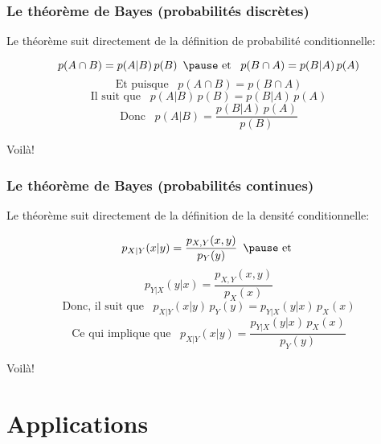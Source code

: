 \documentclass{beamer}
\begin{document}
\begin{frame}
    \frametitle{Le théorème de Bayes (probabilités discrètes)}
    Le théorème suit directement de la définition de probabilité conditionnelle:

    \pause

    \[p(A \cap B) =  p(A | B) \, p(B) \,\,\, \pause \textrm{ et } \,\,\, p(B \cap A) =  p(B | A) \, p(A)\]
    \pause
    \[\textrm{Et puisque } \,\,\, p(A \cap B) = p(B \cap A)\]
    \pause
    \[\textrm{Il suit que } \,\,\, p(A | B) \, p(B) = p(B | A) \, p(A)\]
    \pause
    \[\textrm{Donc } \,\,\, p(A | B) = \frac{p(B | A) \, p(A)}{p(B)}\]
    
    Voilà!
\end{frame}


\begin{frame}
    \frametitle{Le théorème de Bayes (probabilités continues)}
    Le théorème suit directement de la définition de la densité conditionnelle:

    \pause

    \[p_{X|Y}(x|y) = \frac{p_{X,Y}(x,y)}{p_Y(y)} \,\,\, \pause \textrm{ et }\]
    \[p_{Y|X}(y|x) = \frac{p_{X,Y}(x,y)}{p_X(x)}\]
    \pause
    \[\textrm{Donc, il suit que } \,\,\, p_{X|Y}(x|y) \, p_Y(y) = p_{Y|X}(y|x) \, p_X(x)\]
    \pause
    \[\textrm{Ce qui implique que } \,\,\, p_{X|Y}(x|y) = \frac{p_{Y|X}(y|x) \, p_X(x)}{p_Y(y)}\]

    Voilà!
\end{frame}



\section{Applications}
\end{document}
